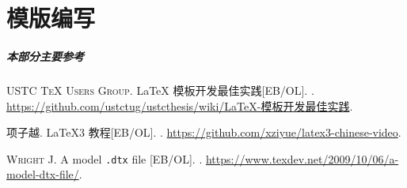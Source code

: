 
\part{模版编写}

\begin{frame}
  \frametitle{本部分主要参考}

  \begin{bibliolist}{00}
    \onlineitem \textsc{USTC \TeX{} Users Group}.
    \newblock \LaTeX{} 模板开发最佳实践[EB/OL].
    . \href{https://github.com/ustctug/ustcthesis/wiki/LaTeX-模板开发最佳实践}
    {\ttfamily https://github.com/ustctug/ustcthesis/wiki/LaTeX-模板开发最佳实践}.

    \onlineitem 项子越.
    \newblock \LaTeX3 教程[EB/OL].
    . \url{https://github.com/xziyue/latex3-chinese-video}.

    \onlineitem \textsc{Wright J.}
    \newblock A model \texttt{.dtx} file [EB/OL].
    . \url{https://www.texdev.net/2009/10/06/a-model-dtx-file/}.
  \end{bibliolist}

\end{frame}

